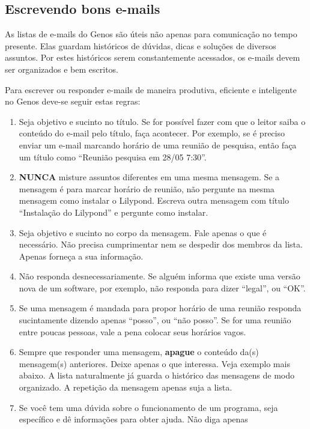 \documentclass[12pt,brazil]{book}
\begin{document}
\subsection{Escrevendo bons e-mails}
\label{sec:escrevendo-bons-e}

As listas de e-mails do Genos são úteis não apenas para comunicação no
tempo presente. Elas guardam históricos de dúvidas, dicas e soluções
de diversos assuntos. Por estes históricos serem constantemente
acessados, os e-mails devem ser organizados e bem escritos.

Para escrever ou responder e-mails de maneira produtiva, eficiente e
inteligente no Genos deve-se seguir estas regras:

\begin{enumerate}
\item Seja objetivo e sucinto no título. Se for possível fazer com que
  o leitor saiba o conteúdo do e-mail pelo título, faça acontecer. Por
  exemplo, se é preciso enviar um e-mail marcando horário de uma
  reunião de pesquisa, então faça um título como ``Reunião pesquisa em
  28/05 7:30''.
\item \textbf{NUNCA} misture assuntos diferentes em uma mesma
  mensagem. Se a mensagem é para marcar horário de reunião, não
  pergunte na mesma mensagem como instalar o Lilypond. Escreva outra
  mensagem com título ``Instalação do Lilypond'' e pergunte como
  instalar.
\item Seja objetivo e sucinto no corpo da mensagem. Fale apenas o que
  é necessário. Não precisa cumprimentar nem se despedir dos membros
  da lista. Apenas forneça a sua informação.
\item Não responda desnecessariamente. Se alguém informa que existe
  uma versão nova de um software, por exemplo, não responda para dizer
  ``legal'', ou ``OK''.
\item Se uma mensagem é mandada para propor horário de uma reunião
  responda sucintamente dizendo apenas ``posso'', ou ``não posso''. Se
  for uma reunião entre poucas pessoas, vale a pena colocar seus
  horários vagos.
\item Sempre que responder uma mensagem, \textbf{apague} o conteúdo
  da(s) mensagem(s) anteriores. Deixe apenas o que interessa. Veja
  exemplo mais abaixo. A lista naturalmente já guarda o histórico das
  mensagens de modo organizado. A repetição da mensagem apenas suja a
  lista.
\item Se você tem uma dúvida sobre o funcionamento de um programa,
  seja específico e dê informações para obter ajuda. Não diga apenas

\end{enumerate}
\end{document}
